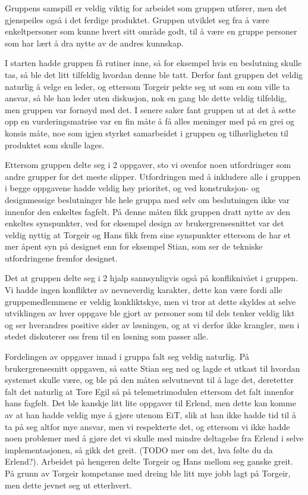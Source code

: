 Gruppens samspill er veldig viktig for arbeidet som gruppen utfører, men det gjenspeiles også i det ferdige produktet.
Gruppen utviklet seg fra å være enkeltpersoner som kunne hvert sitt område godt, til å være en gruppe personer som har lært å dra nytte av de andres kunnskap.

I starten hadde gruppen få rutiner inne, så for eksempel hvis en beslutning skulle tas, så ble det litt tilfeldig hvordan denne ble tatt. Derfor fant gruppen det veldig naturlig å velge en leder, og ettersom Torgeir pekte seg ut som en som ville ta ansvar, så ble han leder uten diskusjon, nok en gang ble dette veldig tilfeldig, men gruppen var fornøyd med det. I senere saker fant gruppen ut at det å sette opp en vurderingsmatrise var en fin måte å få alles meninger med på en grei og konsis måte, noe som igjen styrket samarbeidet i gruppen og tilhørligheten til produktet som skulle lages.

Ettersom gruppen delte seg i 2 oppgaver, sto vi ovenfor noen utfordringer som andre grupper for det meste slipper. Utfordringen med å inkludere alle i gruppen i begge oppgavene hadde veldig høy prioritet, og ved konstruksjon- og designmessige beslutninger ble hele gruppa med selv om beslutningen ikke var innenfor den enkeltes fagfelt. På denne måten fikk gruppen dratt nytte av den enkeltes synspunkter, ved for eksempel design av brukergrensesnittet var det veldig nyttig at Torgeir og Hans fikk frem sine synspunkter ettersom de har et mer åpent syn på designet enn for eksempel Stian, som ser de tekniske utfordringene fremfor designet.

Det at gruppen delte seg i 2 hjalp sannsynligvis også på konfliknivået i gruppen. Vi hadde ingen konflikter av nevneverdig karakter, dette kan være fordi alle gruppemedlemmene er veldig konkliktskye, men vi tror at dette skyldes at selve utviklingen av hver oppgave ble gjort av personer som til dels tenker veldig likt og ser hverandres positive sider av løsningen, og at vi derfor ikke krangler, men i stedet diskuterer oss frem til en løsning som passer alle.

Fordelingen av oppgaver innad i gruppa falt seg veldig naturlig. På brukergrensesnitt oppgaven, så satte Stian seg ned og lagde et utkast til hvordan systemet skulle være, og ble på den måten selvutnevnt til å lage det, deretetter falt det naturlig at Tore Egil så på telemetrimodulen ettersom det falt innenfor hans fagfelt. Det ble kanskje litt lite oppgaver til Erlend, men dette kan komme av at han hadde veldig mye å gjøre utenom EiT, slik at han ikke hadde tid til å ta på seg altfor mye ansvar, men vi respekterte det, og ettersom vi ikke hadde noen problemer med å gjøre det vi skulle med mindre deltagelse fra Erlend i selve implementasjonen, så gikk det greit. (TODO mer om det, hva følte du da Erlend?). Arbeidet på hengeren delte Torgeir og Hans mellom seg ganske greit. På grunn av Torgeir kompetanse med dreing ble litt mye jobb lagt på Torgeir, men dette jevnet seg ut etterhvert.

